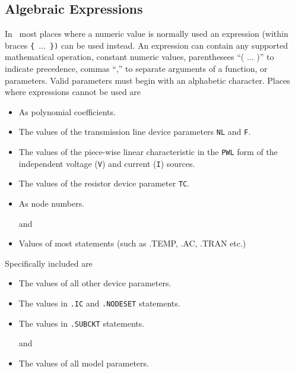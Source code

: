 \clearpage
\subsection{Algebraic Expressions}

In \pspice\ most places where a numeric value is normally used
an expression (within braces {\tt \{ $\ldots$ \})} can be used instead.
An expression can contain any supported mathematical operation,
constant numeric values, parenthesees ``( $\ldots$ )'' to indicate precedence,
commas ``,'' to separate arguments of a function,
or parameters. Valid parameters must begin with an alphabetic character.
Places where expressions cannot be used are 
     \begin{itemize}
     \item As polynomial coefficients.
     \item The values of the transmission line device parameters {\tt NL} and
           {\tt F}.
     \item The values of the piece-wise linear characteristic in the {\tt PWL}
           form of the independent voltage ({\tt V}) and current ({\tt I})
           sources.
     \item The values of the resistor device parameter {\tt TC}.
     \item As node numbers.
     \item[and]
     \item Values of most statements (such as .TEMP, .AC, .TRAN etc.)
     \end{itemize}
Specifically included are
     \begin{itemize}
     \item The values of all other device parameters.
     \item The values in {\tt .IC} and {\tt .NODESET} statements.
     \item The values in {\tt .SUBCKT} statements.
     \item[and]
     \item The values of all model parameters.
     \end{itemize}

